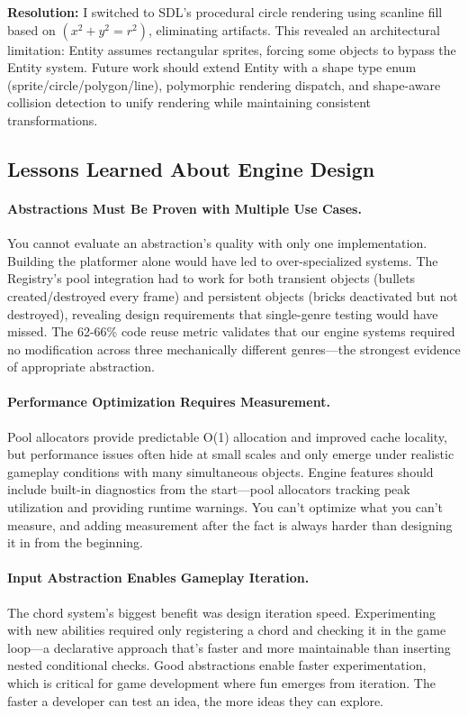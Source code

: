 \documentclass[12pt]{article}
\begin{document}
\textbf{Resolution:} I switched to SDL's procedural circle rendering using scanline fill based on $(x^2 + y^2 = r^2)$, eliminating artifacts. This revealed an architectural limitation: Entity assumes rectangular sprites, forcing some objects to bypass the Entity system. Future work should extend Entity with a shape type enum (sprite/circle/polygon/line), polymorphic rendering dispatch, and shape-aware collision detection to unify rendering while maintaining consistent transformations.

\subsection{Lessons Learned About Engine Design}

\paragraph{Abstractions Must Be Proven with Multiple Use Cases.}
You cannot evaluate an abstraction's quality with only one implementation. Building the platformer alone would have led to over-specialized systems. The Registry's pool integration had to work for both transient objects (bullets created/destroyed every frame) and persistent objects (bricks deactivated but not destroyed), revealing design requirements that single-genre testing would have missed. The 62-66\% code reuse metric validates that our engine systems required no modification across three mechanically different genres—the strongest evidence of appropriate abstraction.

\paragraph{Performance Optimization Requires Measurement.}
Pool allocators provide predictable O(1) allocation and improved cache locality, but performance issues often hide at small scales and only emerge under realistic gameplay conditions with many simultaneous objects. Engine features should include built-in diagnostics from the start—pool allocators tracking peak utilization and providing runtime warnings. You can't optimize what you can't measure, and adding measurement after the fact is always harder than designing it in from the beginning.

\paragraph{Input Abstraction Enables Gameplay Iteration.}
The chord system's biggest benefit was design iteration speed. Experimenting with new abilities required only registering a chord and checking it in the game loop—a declarative approach that's faster and more maintainable than inserting nested conditional checks. Good abstractions enable faster experimentation, which is critical for game development where fun emerges from iteration. The faster a developer can test an idea, the more ideas they can explore.
\end{document}
